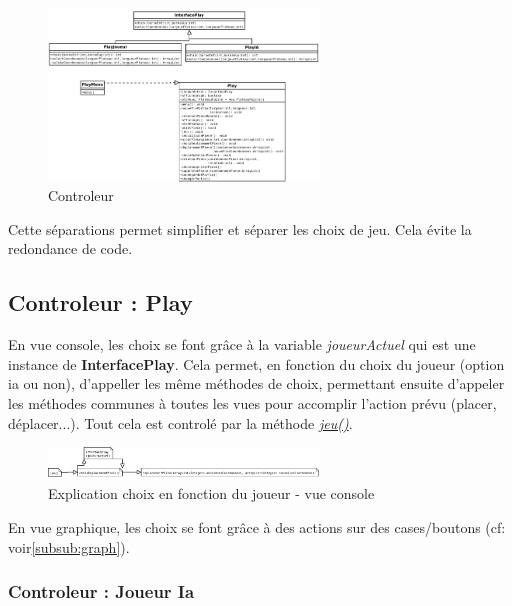        \begin{figure}[H]
			\centering\includegraphics[width=0.64\textwidth, keepaspectratio]{img/diaControleur.png}
			\caption{Controleur}
			\label{fig:diaControleur}
		\end{figure}

        Cette séparations permet simplifier et séparer les choix de jeu. Cela évite la redondance de code.

        \subsection{Controleur : Play}

        En vue console, les choix se font grâce à la variable \textit{joueurActuel} qui est une instance de \textbf{InterfacePlay}. Cela permet, en fonction du choix du joueur (option ia ou non), d'appeller les même méthodes de choix, permettant ensuite d'appeler les méthodes communes à toutes les vues pour accomplir l'action prévu (placer, déplacer...). Tout cela est controlé par la méthode \underline{\textit{jeu()}}.

        \begin{figure}[H]
			\centering\includegraphics[width=0.64\textwidth, keepaspectratio]{img/graphJoueurChoix.png}
			\caption{Explication choix en fonction du joueur - vue console}
			\label{fig:graphJoueurChoix}
		\end{figure}

        En vue graphique, les choix se font grâce à des actions sur des cases/boutons (cf: voir\ref{subsub:graph}).

        \subsubsection{Controleur : Joueur Ia}\label{subsub:jeuIa}

